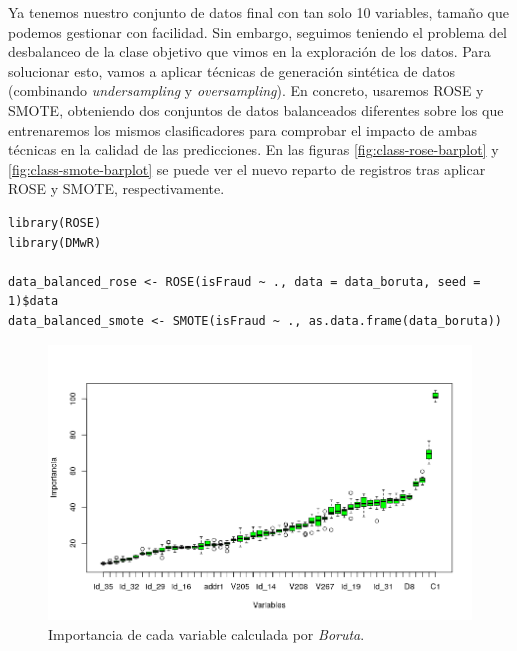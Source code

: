 Ya tenemos nuestro conjunto de datos final con tan solo 10 variables, tamaño que
podemos gestionar con facilidad. Sin embargo, seguimos teniendo el problema del
desbalanceo de la clase objetivo que vimos en la exploración de los datos. Para
solucionar esto, vamos a aplicar técnicas de generación sintética de datos
(combinando \textit{undersampling} y \textit{oversampling}). En concreto,
usaremos ROSE y SMOTE, obteniendo dos conjuntos de datos balanceados diferentes
sobre los que entrenaremos los mismos clasificadores para comprobar el
impacto de ambas técnicas en la calidad de las predicciones. En las figuras
\ref{fig:class-rose-barplot} y \ref{fig:class-smote-barplot} se puede ver el
nuevo reparto de registros tras aplicar ROSE y SMOTE, respectivamente.

\begin{lstlisting}
library(ROSE)
library(DMwR)

data_balanced_rose <- ROSE(isFraud ~ ., data = data_boruta, seed = 1)$data
data_balanced_smote <- SMOTE(isFraud ~ ., as.data.frame(data_boruta))
\end{lstlisting}

\begin{figure}[h!]
    \includegraphics[width=\textwidth]{images/preprocessing/boruta-boxplot.png}
    \caption{Importancia de cada variable calculada por \textit{Boruta}.}
    \label{fig:boruta-boxplot}
\end{figure}

